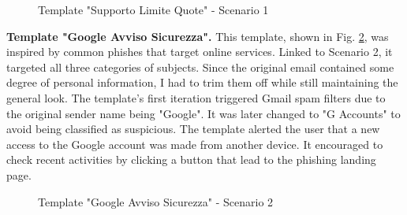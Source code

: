 \documentclass[a4paper]{article}
\begin{document}
\bigskip

\begin{figure}[H]
	\centering
	\caption{Template "Supporto Limite Quote" - Scenario 1}
	\label{template-s1b1}
\end{figure}

\newpage

\noindent
\textbf{Template "Google Avviso Sicurezza".} This template, shown in Fig. \ref{template-s2b1}, was inspired by common phishes that target online services. Linked to Scenario 2, it targeted all three categories of subjects. Since the original email contained some degree of personal information, I had to trim them off while still maintaining the general look. The template's first iteration triggered Gmail spam filters due to the original sender name being "Google". It was later changed to "G Accounts" to avoid being classified as suspicious. The template alerted the user that a new access to the Google account was made from another device. It encouraged to check recent activities by clicking a button that lead to the phishing landing page.

\hypertarget{template-s2b1}{}

\bigskip

\begin{figure}[H]
	\centering
	\caption{Template "Google Avviso Sicurezza" - Scenario 2}
	\label{template-s2b1}
\end{figure}
\end{document}
